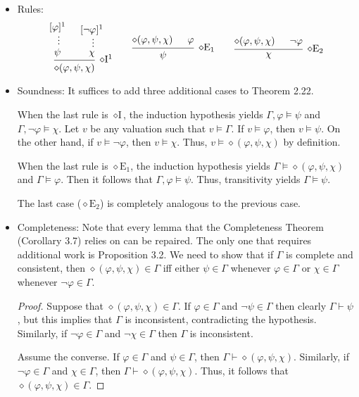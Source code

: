 \documentclass[a4paper]{article}
\begin{document}
\section{}
\begin{itemize}
\item Rules:
  \[
    \begin{prooftree}
      \hypo{[\varphi]^{1}}
      \ellipsis{}{\psi}
      \hypo{[\lnot\varphi]^{1}}
      \ellipsis{}{\chi}
      \infer2[$\diamond$I$^1$]{\diamond(\varphi,\psi,\chi)}
    \end{prooftree}
    \qquad
    \begin{prooftree}
      \hypo{\diamond(\varphi,\psi,\chi)}
      \hypo{\varphi}
      \infer2[$\diamond$E$_{1}$]{\psi}
    \end{prooftree}
    \qquad
    \begin{prooftree}
      \hypo{\diamond(\varphi,\psi,\chi)}
      \hypo{\lnot\varphi}
      \infer2[$\diamond$E$_{2}$]{\chi}
    \end{prooftree}
  \]
\item Soundness: It suffices to add three additional cases to Theorem 2.22.

  When the last rule is $\diamond\text{I}$, the induction hypothesis yields $\Gamma,\varphi \models \psi$ and $\Gamma,\lnot\varphi \models \chi$.
  Let $v$ be any valuation such that $v \models \Gamma$.
  If $v \models \varphi$, then $v \models \psi$.
  On the other hand, if $v \models \lnot\varphi$, then $v \models \chi$.
  Thus, $v \models \diamond(\varphi,\psi,\chi)$ by definition.

  When the last rule is $\diamond\text{E}_{1}$, the induction hypothesis yields $\Gamma \models \diamond(\varphi,\psi,\chi)$ and $\Gamma \models \varphi$.
  Then it follows that $\Gamma,\varphi \models \psi$.
  Thus, transitivity yields $\Gamma \models \psi$.

  The last case ($\diamond\text{E}_{2}$) is completely analogous to the previous case.
\item Completeness: Note that every lemma that the Completeness Theorem (Corollary 3.7) relies on can be repaired.
  The only one that requires additional work is Proposition 3.2.
  We need to show that if $\Gamma$ is complete and consistent, then $\diamond(\varphi,\psi,\chi) \in \Gamma$ iff either $\psi \in \Gamma$ whenever $\varphi \in \Gamma$ or $\chi \in \Gamma$ whenever $\lnot \varphi \in \Gamma$.
  \begin{proof}
    Suppose that $\diamond(\varphi,\psi,\chi) \in \Gamma$.
    If $\varphi \in \Gamma$ and $\lnot\psi \in \Gamma$ then clearly $\Gamma \vdash \psi$, but this implies that $\Gamma$ is inconsistent, contradicting the hypothesis.
    Similarly, if $\lnot\varphi\in \Gamma$ and $\lnot \chi \in \Gamma$ then $\Gamma$ is inconsistent.

    Assume the converse.
    If $\varphi \in \Gamma$ and $\psi \in \Gamma$, then $\Gamma \vdash \diamond(\varphi,\psi,\chi)$.
    Similarly, if $\lnot\varphi \in \Gamma$ and $\chi \in \Gamma$, then $\Gamma \vdash \diamond(\varphi,\psi,\chi)$.
    Thus, it follows that $\diamond(\varphi,\psi,\chi) \in \Gamma$.
  \end{proof}
\end{itemize}

\end{document}
